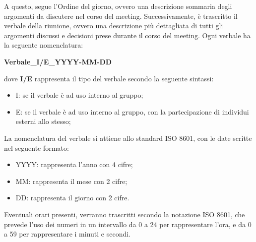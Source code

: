 A questo, segue l’Ordine del giorno, ovvero una descrizione sommaria degli argomenti da discutere nel corso del meeting. Successivamente, è trascritto il verbale della riunione, ovvero una descrizione più dettagliata di tutti gli argomenti discussi e decisioni prese durante il corso del meeting. Ogni verbale ha la seguente nomenclatura:
\begin{center}
	\textbf{Verbale_I/E_YYYY-MM-DD}
\end{center}
dove \textbf{I/E} rappresenta il tipo del verbale secondo la seguente sintassi:
\begin{itemize}
	\item I: se il verbale è ad uso interno al gruppo;
	\item E: se il verbale è ad uso interno al gruppo, con la partecipazione di individui esterni allo stesso;
\end{itemize}
La nomenclatura del verbale si attiene allo standard ISO 8601, con le date scritte nel seguente formato:
\begin{itemize}
	\item YYYY: rappresenta l’anno con 4 cifre;
	\item MM: rappresenta il mese con 2 cifre;
	\item DD: rappresenta il giorno con 2 cifre.
\end{itemize}

Eventuali orari presenti, verranno trascritti secondo la notazione ISO 8601, che prevede l’uso dei numeri in un intervallo da 0 a 24 per rappresentare l’ora, e da 0 a 59 per rappresentare i minuti e secondi.
